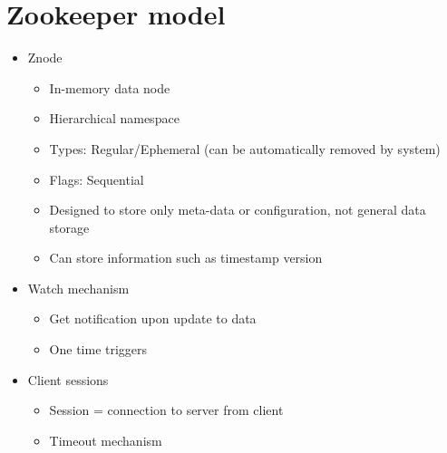 \section{Zookeeper model}

\begin{itemize}
    \item Znode
    \begin{itemize}    
        \item In-memory data node
        \item Hierarchical namespace
        \item Types: Regular/Ephemeral (can be automatically removed by system)
        \item Flags: Sequential
        \item Designed to store only meta-data or configuration, not general data storage
        \item Can store information such as timestamp version
    \end{itemize}
    
    \item Watch mechanism
    \begin{itemize}
        \item Get notification upon update to data
        \item One time triggers
    \end{itemize}
    
    \item Client sessions
    \begin{itemize}
        \item Session = connection to server from client
        \item Timeout mechanism
    \end{itemize}
\end{itemize}